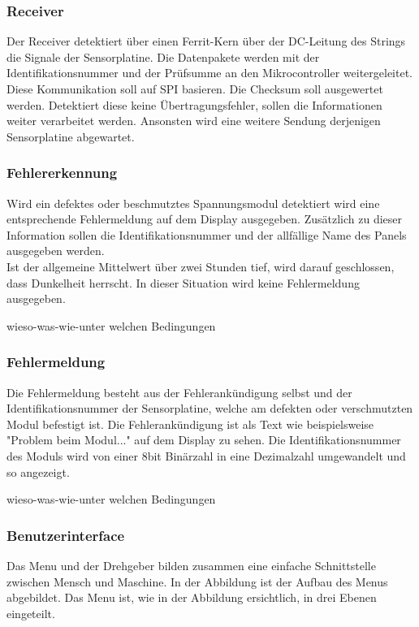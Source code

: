 \subsubsection{Receiver}
Der Receiver detektiert über einen Ferrit-Kern über der DC-Leitung des Strings die Signale der Sensorplatine. Die Datenpakete werden mit der Identifikationsnummer und der Prüfsumme an den Mikrocontroller weitergeleitet. Diese Kommunikation soll auf SPI basieren. Die Checksum soll ausgewertet werden. Detektiert diese keine Übertragungsfehler, sollen die Informationen weiter verarbeitet werden. Ansonsten wird eine weitere Sendung derjenigen Sensorplatine abgewartet. \\

\subsubsection{Fehlererkennung}
Wird ein defektes oder beschmutztes Spannungsmodul detektiert wird eine entsprechende Fehlermeldung auf dem Display ausgegeben. Zusätzlich zu dieser Information sollen die Identifikationsnummer und der allfällige Name des Panels ausgegeben werden. \\
Ist der allgemeine Mittelwert über zwei Stunden tief, wird darauf geschlossen, dass Dunkelheit herrscht. In dieser Situation wird keine Fehlermeldung ausgegeben.



wieso-was-wie-unter welchen Bedingungen
\subsubsection{Fehlermeldung}
Die Fehlermeldung besteht aus der Fehlerankündigung selbst und der Identifikationsnummer der Sensorplatine, welche am defekten oder verschmutzten Modul befestigt ist. Die Fehlerankündigung ist als Text wie beispielsweise "Problem beim Modul..." auf dem Display zu sehen. Die Identifikationsnummer des Moduls wird von einer 8bit Binärzahl in eine Dezimalzahl umgewandelt und so angezeigt.

wieso-was-wie-unter welchen Bedingungen
\subsubsection{Benutzerinterface}
Das Menu und der Drehgeber bilden zusammen eine einfache Schnittstelle zwischen Mensch und Maschine. In der Abbildung  ist der Aufbau des Menus abgebildet. 
Das Menu ist, wie in der Abbildung   ersichtlich, in drei Ebenen eingeteilt.










